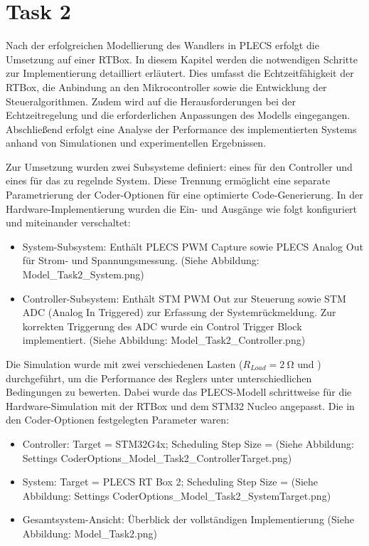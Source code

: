 \section{Task 2} \label{sec:Task2}

Nach der erfolgreichen Modellierung des Wandlers in PLECS erfolgt die Umsetzung auf einer RTBox. In diesem Kapitel werden die notwendigen Schritte zur Implementierung detailliert erläutert. Dies umfasst die Echtzeitfähigkeit der RTBox, die Anbindung an den Mikrocontroller sowie die Entwicklung der Steueralgorithmen. Zudem wird auf die Herausforderungen bei der Echtzeitregelung und die erforderlichen Anpassungen des Modells eingegangen. Abschließend erfolgt eine Analyse der Performance des implementierten Systems anhand von Simulationen und experimentellen Ergebnissen.

Zur Umsetzung wurden zwei Subsysteme definiert: eines für den Controller und eines für das zu regelnde System. Diese Trennung ermöglicht eine separate Parametrierung der Coder-Optionen für eine optimierte Code-Generierung. In der Hardware-Implementierung wurden die Ein- und Ausgänge wie folgt konfiguriert und miteinander verschaltet:

\begin{itemize}
    \item System-Subsystem: Enthält PLECS PWM Capture sowie PLECS Analog Out für Strom- und Spannungsmessung. (Siehe Abbildung: Model_Task2_System.png)

    \item Controller-Subsystem: Enthält STM PWM Out zur Steuerung sowie STM ADC (Analog In Triggered) zur Erfassung der Systemrückmeldung. Zur korrekten Triggerung des ADC wurde ein Control Trigger Block implementiert. (Siehe Abbildung: Model_Task2_Controller.png)
\end{itemize}

Die Simulation wurde mit zwei verschiedenen Lasten ($R_{Load}=\SI{2}{\ohm}$ und ) durchgeführt, um die Performance des Reglers unter unterschiedlichen Bedingungen zu bewerten. Dabei wurde das PLECS-Modell schrittweise für die Hardware-Simulation mit der RTBox und dem STM32 Nucleo angepasst. Die in den Coder-Optionen festgelegten Parameter waren:

\begin{itemize}
    \item Controller: Target = STM32G4x; Scheduling Step Size = (Siehe Abbildung: Settings CoderOptions_Model_Task2_ControllerTarget.png)

    \item System: Target = PLECS RT Box 2; Scheduling Step Size =  (Siehe Abbildung: Settings CoderOptions_Model_Task2_SystemTarget.png)

    \item Gesamtsystem-Ansicht: Überblick der vollständigen Implementierung (Siehe Abbildung: Model_Task2.png)
\end{itemize}

